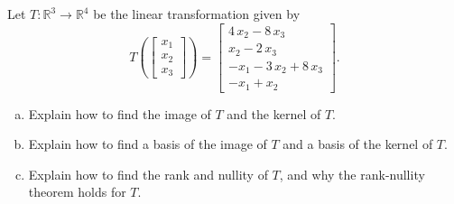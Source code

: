 
\begin{exerciseStatement}
 Let \(T:\mathbb{R}^ 3  \to \mathbb{R}^ 4 \) be the linear transformation given by \[T\left(  \left[\begin{array}{c}
x_{1} \\
x_{2} \\
x_{3}
\end{array}\right]  \right) =  \left[\begin{array}{c}
4 \, x_{2} - 8 \, x_{3} \\
x_{2} - 2 \, x_{3} \\
-x_{1} - 3 \, x_{2} + 8 \, x_{3} \\
-x_{1} + x_{2}
\end{array}\right] .\]
\begin{enumerate}[(a)]
\item Explain how to find the image of \(T\) and the kernel of \(T\).
\item Explain how to find a basis of the image of \(T\) and a basis of the kernel of \(T\).
\item Explain how to find the rank and nullity of \(T\), and why the rank-nullity theorem holds for \(T\).
\end{enumerate}
    
\end{exerciseStatement}
    
